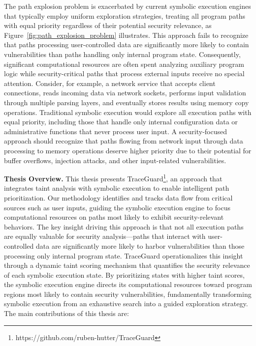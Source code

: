 The path explosion problem is exacerbated by current symbolic execution engines that typically employ uniform exploration strategies, treating all program paths with equal priority regardless of their potential security relevance, as Figure~\ref{fig:path_explosion_problem} illustrates.
This approach fails to recognize that paths processing user-controlled data are significantly more likely to contain vulnerabilities than paths handling only internal program state.
Consequently, significant computational resources are often spent analyzing auxiliary program logic while security-critical paths that process external inputs receive no special attention.
Consider, for example, a network service that accepts client connections, reads incoming data via network sockets, performs input validation through multiple parsing layers, and eventually stores results using memory copy operations.
Traditional symbolic execution would explore all execution paths with equal priority, including those that handle only internal configuration data or administrative functions that never process user input.
A security-focused approach should recognize that paths flowing from network input through data processing to memory operations deserve higher priority due to their potential for buffer overflows, injection attacks, and other input-related vulnerabilities.

\textbf{Thesis Overview.} This thesis presents TraceGuard\footnote{https://github.com/ruben-hutter/TraceGuard}, an approach that integrates taint analysis with symbolic execution to enable intelligent path prioritization.
Our methodology identifies and tracks data flow from critical sources such as user inputs, guiding the symbolic execution engine to focus computational resources on paths most likely to exhibit security-relevant behaviors.
The key insight driving this approach is that not all execution paths are equally valuable for security analysis—paths that interact with user-controlled data are significantly more likely to harbor vulnerabilities than those processing only internal program state.
TraceGuard operationalizes this insight through a dynamic taint scoring mechanism that quantifies the security relevance of each symbolic execution state.
By prioritizing states with higher taint scores, the symbolic execution engine directs its computational resources toward program regions most likely to contain security vulnerabilities, fundamentally transforming symbolic execution from an exhaustive search into a guided exploration strategy.
The main contributions of this thesis are:

